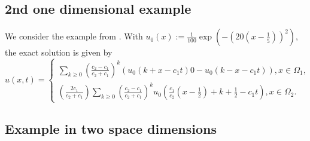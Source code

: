 \documentclass[10pt,reqno]{amsart}
\numberwithin{equation}{section}
\begin{document}
\subsection{2nd one dimensional example}
We consider the example from \cite{BDE22}. With $u_0 (x) := \frac{1}{100} \exp(-(20(x-\frac{1}{5}))^2)$, the exact solution is given by 
\begin{equation}
    u(x,t) = \begin{cases}
      \sum_{k \ge 0} \left( \frac{c_2-c_1}{c_2+c_1}\right)^k \left( u_0 (k + x - c_1 t) 0- u_0(k-x-c_1 t)\right), x \in \Omega_1, \\
      \left( \frac{2c_1}{c_2+c_1}\right) \sum_{k \ge 0} \left( \frac{c_2 - c_1}{c_2 + c_1}\right)^k u_0 \left( \frac{c_1}{c_2} \left( x - \frac{1}{2}\right) +k + \frac{1}{2} - c_1 t \right), x \in \Omega_2. 
    \end{cases}
\end{equation}


\subsection{Example in two space dimensions}



\end{document}
